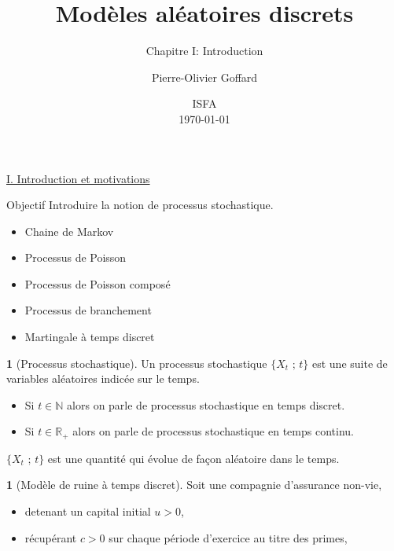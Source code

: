 \documentclass[8pt,notheorems]{beamer}
\title[]{Modèles aléatoires discrets}
\subtitle{Chapitre I: Introduction}
\author{Pierre-Olivier Goffard}
\institute{
	   Université de Lyon 1\\
	ISFA\\
	   \texttt{pierre-olivier.goffard@univ-lyon1.fr}
	  }
\date{
ISFA\\
\today}
\theoremstyle{definition}
\newtheorem{definition}{\translate{Definition}}
\theoremstyle{example}
\newtheorem{example}{\translate{Example}}
\theoremstyle{mystyle}
\theoremstyle{plain}
\begin{document}
\frame{\titlepage}


\begin{frame}[allowframebreaks]
\underline{I. Introduction et motivations}\\
\begin{block}{Objectif}
Introduire la notion de processus stochastique.
\begin{itemize}
\item Chaine de Markov
\item Processus de Poisson
\item Processus de Poisson composé
\item Processus de branchement
\item Martingale à temps discret
\end{itemize}
\end{block}
\begin{definition}[Processus stochastique]
Un processus stochastique $\{X_t\text{ ; }t\}$ est une suite de variables aléatoires indicée sur le temps.
\begin{itemize}
\item Si $t\in\mathbb{N}$ alors on parle de processus stochastique en temps discret.
\item Si $t\in\mathbb{R}_+$ alors on parle de processus stochastique en temps continu.
\end{itemize}
$\{X_t\text{ ; }t\}$ est une quantité qui évolue de façon aléatoire dans le temps.
\end{definition}
\begin{example}[Modèle de ruine à temps discret]
Soit une compagnie d'assurance non-vie,
\begin{itemize}
\item detenant un capital initial $u>0$,
\item récupérant $c>0$ sur chaque période d'exercice au titre des primes,

\end{itemize}
\end{example}
\end{frame}
\end{document}
